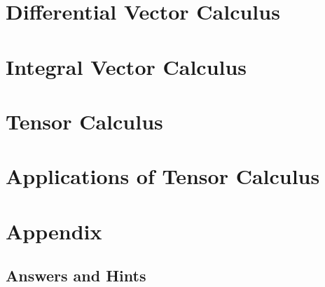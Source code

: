 \documentclass[11pt,oneside]{book} %
\begin{document}
\tableofcontents%
\cleardoublepage%
\pagestyle{fancy} %



 \part{Differential Vector Calculus}
  \part{Integral Vector Calculus}
 \part{Tensor Calculus}
 \part{Applications of Tensor Calculus}

\part{Appendix}
\appendix
 
\chapter{Answers and Hints}
{\small }

\nocite{*}
\printbibliography
\setlength{\columnsep}{0.75cm}
\printindex
\end{document}
